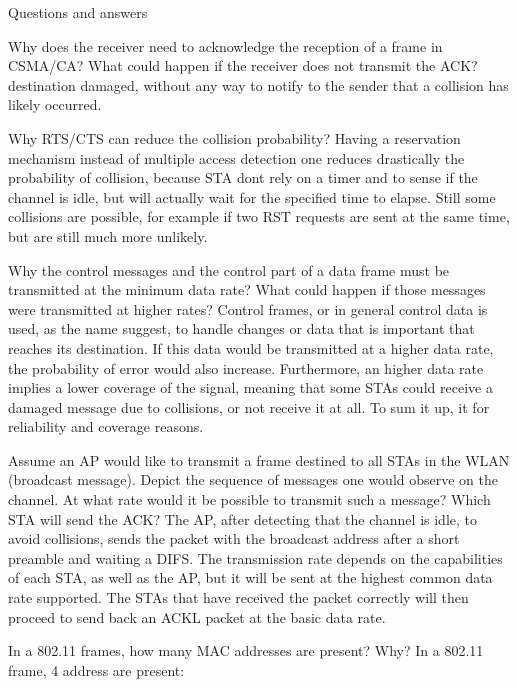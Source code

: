 \begin{section}{Questions and answers}
\begin{subsubsection}{Why does the receiver need to acknowledge the reception of a frame in
    CSMA/CA? What could happen if the receiver does not transmit the ACK?}
    destination damaged, without any way to notify to the sender that a collision has likely
    occurred.
  \end{subsubsection}
  \begin{subsubsection}{Why RTS/CTS can reduce the collision probability?}
    Having a reservation mechanism instead of multiple access detection one reduces drastically the
    probability of collision, because STA dont rely on a timer and to sense if the channel is idle,
    but will actually wait for the specified time to elapse. Still some collisions are possible, for
    example if two RST requests are sent at the same time, but are still much more unlikely.
  \end{subsubsection}
  \begin{subsubsection}{Why the control messages and the control part of a data frame must be
      transmitted at the minimum data rate? What could happen if those messages were transmitted at
    higher rates?}
    Control frames, or in general control data is used, as the name suggest, to handle changes or
    data that is important that reaches its destination. If this data would be transmitted at a
    higher data rate, the probability of error would also increase. Furthermore, an higher data rate
    implies a lower coverage of the signal, meaning that some STAs could receive a damaged message
    due to collisions, or not receive it at all. To sum it up, it for reliability and coverage
    reasons.
  \end{subsubsection}
  \begin{subsubsection}{Assume an AP would like to transmit a frame destined to all STAs in the WLAN
      (broadcast message). Depict the sequence of messages one would observe on the channel. At what
    rate would it be possible to transmit such a message? Which STA will send the ACK?}
    The AP, after detecting that the channel is idle, to avoid collisions, sends the packet with the
    broadcast address after a short preamble and waiting a DIFS. The transmission rate depends on
    the capabilities of each STA, as well as the AP, but it will be sent at the highest common data
    rate supported. The STAs that have received the packet correctly will then proceed to send back
    an ACKL packet at the basic data rate.
  \end{subsubsection}
  \begin{subsubsection}{In a 802.11 frames, how many MAC addresses are present? Why?}
    In a 802.11 frame, 4 address are present:
    \begin{itemize}

\end{itemize}
\end{subsubsection}
\end{section}
